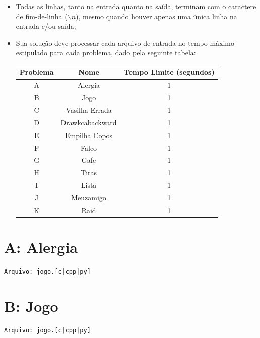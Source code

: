 \documentclass[12pt,oneside]{article} %
\begin{document}
\begin{itemize}
    \item Todas as linhas, tanto na entrada quanto na saída, terminam com o
    caractere de fim-de-linha ($\backslash n$), mesmo quando houver apenas uma única
    linha na entrada e/ou saída;

    \item Sua solução deve processar cada arquivo de entrada no tempo máximo
    estipulado para cada problema, dado pela seguinte tabela:

    \begin{table}[h]
    \centering
    \begin{tabular}{|c|c||c|}
    \hline
    \textbf{Problema} & \textbf{Nome} & \textbf{Tempo Limite (segundos)} \\
    \hline
    A & Alergia & 1 \\
    \hline
    B & Jogo & 1 \\
    \hline
    C & Vasilha Errada & 1 \\
    \hline
    D & Drawkcabackward & 1 \\
    \hline
    E & Empilha Copos & 1 \\
    \hline
    F & Falco & 1 \\
    \hline
    G & Gafe & 1 \\
    \hline
    H & Tiras & 1 \\
    \hline
    I & Lista & 1 \\
    \hline
    J & Meuzamigo & 1 \\
    \hline
    K & Raid & 1 \\
    \hline
    \end{tabular}
    \end{table}

\end{itemize}

\newpage
\section*{A: Alergia} %
\vspace{-0.52cm}
\noindent \begin{verbatim}Arquivo: jogo.[c|cpp|py]\end{verbatim}


\newpage
\section*{B: Jogo} %
\vspace{-0.52cm}
\noindent \begin{verbatim}Arquivo: jogo.[c|cpp|py]\end{verbatim}

\end{document}
